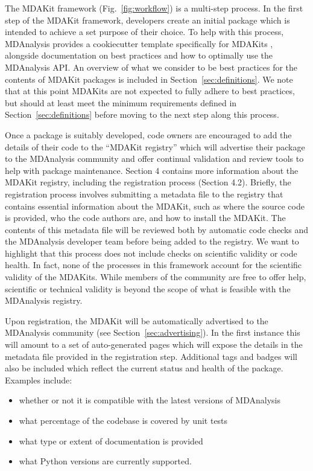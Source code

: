 \documentclass[9pt,whitepaper]{livecoms}
\begin{document}
The MDAKit framework (Fig.~\ref{fig:workflow}) is a multi-step process. In the first step of the MDAKit framework, developers create an initial package which is intended to achieve a set purpose of their choice. To help with this process, MDAnalysis provides a cookiecutter template specifically for MDAKits \cite{wang_cookiecutter_nodate}, alongside documentation on best practices and how to optimally use the MDAnalysis API. An overview of what we consider to be best practices for the contents of MDAKit packages is included in Section~\ref{sec:definitions}. We note that at this point MDAKits are not expected to fully adhere to best practices, but should at least meet the minimum requirements defined in Section~\ref{sec:definitions} before moving to the next step along this process.

Once a package is suitably developed, code owners are encouraged to add the details of their code to the “MDAKit registry” which will advertise their package to the MDAnalysis community and offer continual validation and review tools to help with package maintenance. Section 4 contains more information about the MDAKit registry, including the registration process (Section 4.2). Briefly, the registration process involves submitting a metadata file to the registry that contains essential information about the MDAKit, such as where the source code is provided, who the code authors are, and how to install the MDAKit. The contents of this metadata file will be reviewed both by automatic code checks and the MDAnalysis developer team before being  added to the registry. We want to highlight  that this process does not include checks on scientific validity or code health. In fact, none of the processes in this framework account for the scientific validity of the MDAKits. While members of the community are free to offer help, scientific or technical validity is beyond the scope of what is feasible with the MDAnalysis registry.

Upon registration, the MDAKit will be automatically advertised to the MDAnalysis community (see Section~\ref{sec:advertising}). In the first instance this will amount to a set of auto-generated pages which will expose the details in the metadata file provided in the registration step. Additional tags and badges will also be included which reflect the current status and health of the package. Examples include:
\begin{itemize}
    \item whether or not it is compatible with the latest versions of MDAnalysis
    \item what percentage of the codebase is covered by unit tests
    \item what type or extent of documentation is provided
    \item what Python versions are currently supported.
\end{itemize}
\end{document}

